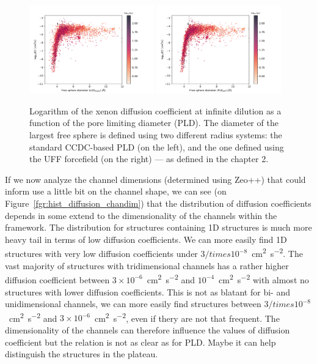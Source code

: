 \documentclass[main]{subfiles}
\begin{document}
\begin{figure}[ht]
  \centering
    \includegraphics[width=0.48\textwidth]{figures/5-diffusion/D_log-diameter_ccdc_colored_s_+.pdf}
    \includegraphics[width=0.48\textwidth]{figures/5-diffusion/D_log-diameter_colored_s_+.pdf}
    \caption{Logarithm of the xenon diffusion coefficient at infinite dilution as a function of the pore limiting diameter (PLD). The diameter of the largest free sphere is defined using two different radius systems: the standard CCDC-based PLD (on the left), and the one defined using the UFF forcefield (on the right)\autocite{Hung_2021} --- as defined in the chapter 2. }\label{fgr:diff_pld}
\end{figure}

If we now analyze the channel dimensions (determined using Zeo++) that could inform use a little bit on the channel shape, we can see (on Figure~\ref{fgr:hist_diffusion_chandim}) that the distribution of diffusion coefficients depends in some extend to the dimensionality of the channels within the framework. The distribution for structures containing 1D structures is much more heavy tail in terms of low diffusion coefficients. We can more easily find 1D structures with very low diffusion coefficients under $3/times 10^{-8}$~\si{\square\cm\per\square\s}. The vast majority of structures with tridimensional channels has a rather higher diffusion coefficient between $3\times 10^{-6}$~\si{\square\cm\per\square\s} and $10^{-4}$~\si{\square\cm\per\square\s} with almost no structures with lower diffusion coefficients. This is not as blatant for bi- and unidimensional channels, we can more easily find structures between $3/times 10^{-8}$~\si{\square\cm\per\square\s} and $3\times 10^{-6}$~\si{\square\cm\per\square\s}, even if thery are not that frequent. The dimensionality of the channels can therefore influence the values of diffusion coefficient but the relation is not as clear as for PLD. Maybe it can help distinguish the structures in the plateau.
\end{document}
